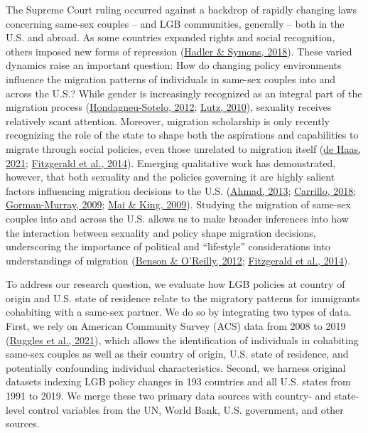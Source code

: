 \documentclass[
  12pt,
]{article}
\begin{document}
The Supreme Court ruling occurred against a backdrop of rapidly changing laws concerning same-sex couples -- and LGB communities, generally -- both in the U.S. and abroad. As some countries expanded rights and social recognition, others imposed new forms of repression (\protect\hyperlink{ref-hadler_2018_world}{Hadler \& Symons, 2018}). These varied dynamics raise an important question: How do changing policy environments influence the migration patterns of individuals in same-sex couples into and across the U.S.? While gender is increasingly recognized as an integral part of the migration process (\protect\hyperlink{ref-hondagneu-sotelo_2012}{Hondagneu-Sotelo, 2012}; \protect\hyperlink{ref-lutz_2010}{Lutz, 2010}), sexuality receives relatively scant attention. Moreover, migration scholarship is only recently recognizing the role of the state to shape both the aspirations and capabilities to migrate through social policies, even those unrelated to migration itself (\protect\hyperlink{ref-dehaas_2021}{de Haas, 2021}; \protect\hyperlink{ref-fitzgerald_2014}{Fitzgerald et al., 2014}). Emerging qualitative work has demonstrated, however, that both sexuality and the policies governing it are highly salient factors influencing migration decisions to the U.S. (\protect\hyperlink{ref-ahmad_2013}{Ahmad, 2013}; \protect\hyperlink{ref-carrillo_2018}{Carrillo, 2018}; \protect\hyperlink{ref-gorman-murray_2009}{Gorman-Murray, 2009}; \protect\hyperlink{ref-mai_2009}{Mai \& King, 2009}). Studying the migration of same-sex couples into and across the U.S. allows us to make broader inferences into how the interaction between sexuality and policy shape migration decisions, underscoring the importance of political and ``lifestyle'' considerations into understandings of migration (\protect\hyperlink{ref-benson_2012}{Benson \& O'Reilly, 2012}; \protect\hyperlink{ref-fitzgerald_2014}{Fitzgerald et al., 2014}).

To address our research question, we evaluate how LGB policies at country of origin and U.S. state of residence relate to the migratory patterns for immigrants cohabiting with a same-sex partner. We do so by integrating two types of data. First, we rely on American Community Survey (ACS) data from 2008 to 2019 (\protect\hyperlink{ref-ruggles_2021}{Ruggles et al., 2021}), which allows the identification of individuals in cohabiting same-sex couples as well as their country of origin, U.S. state of residence, and potentially confounding individual characteristics. Second, we harness original datasets indexing LGB policy changes in 193 countries and all U.S. states from 1991 to 2019. We merge these two primary data sources with country- and state-level control variables from the UN, World Bank, U.S. government, and other sources.
\end{document}
